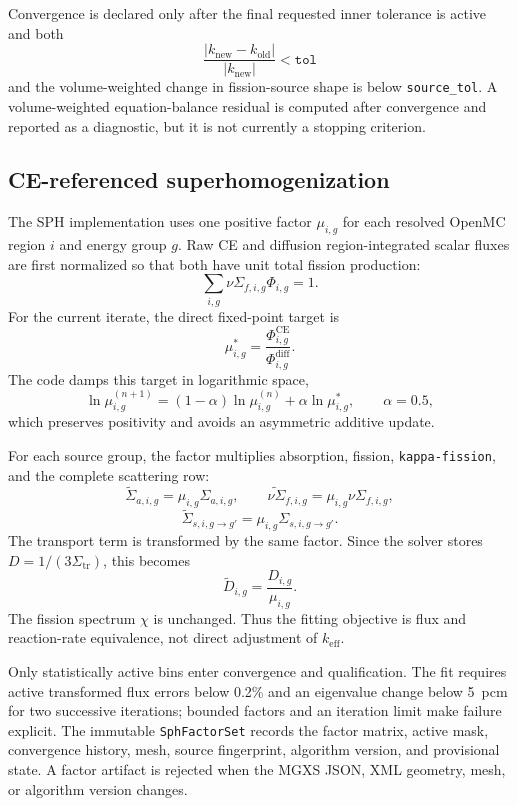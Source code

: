 \documentclass[11pt]{article}
\begin{document}
Convergence is declared only after the final requested inner tolerance is
active and both
\[
\frac{|k_{\mathrm{new}}-k_{\mathrm{old}}|}
{|k_{\mathrm{new}}|}<\texttt{tol}
\]
and the volume-weighted change in fission-source shape is below
\texttt{source\_tol}.  A volume-weighted equation-balance residual is computed
after convergence and reported as a diagnostic, but it is not currently a
stopping criterion.

\subsection{CE-referenced superhomogenization}

The SPH implementation uses one positive factor $\mu_{i,g}$ for each resolved
OpenMC region $i$ and energy group $g$.  Raw CE and diffusion
region-integrated scalar fluxes are first normalized so that both have unit
total fission production:
\[
\sum_{i,g}\nu\Sigma_{f,i,g}\Phi_{i,g}=1.
\]
For the current iterate, the direct fixed-point target is
\[
\mu_{i,g}^{*}
=
\frac{\Phi_{i,g}^{\mathrm{CE}}}
     {\Phi_{i,g}^{\mathrm{diff}}}.
\]
The code damps this target in logarithmic space,
\[
\ln\mu_{i,g}^{(n+1)}
=(1-\alpha)\ln\mu_{i,g}^{(n)}
+ \alpha\ln\mu_{i,g}^{*},
\qquad \alpha=0.5 ,
\]
which preserves positivity and avoids an asymmetric additive update.

For each source group, the factor multiplies absorption, fission,
\texttt{kappa-fission}, and the complete scattering row:
\[
\widetilde{\Sigma}_{a,i,g}=\mu_{i,g}\Sigma_{a,i,g},\qquad
\widetilde{\nu\Sigma}_{f,i,g}=\mu_{i,g}\nu\Sigma_{f,i,g},
\]
\[
\widetilde{\Sigma}_{s,i,g\rightarrow g'}
=\mu_{i,g}\Sigma_{s,i,g\rightarrow g'} .
\]
The transport term is transformed by the same factor.  Since the solver stores
$D=1/(3\Sigma_{\mathrm{tr}})$, this becomes
\[
\widetilde{D}_{i,g}=\frac{D_{i,g}}{\mu_{i,g}} .
\]
The fission spectrum $\chi$ is unchanged.  Thus the fitting objective is flux
and reaction-rate equivalence, not direct adjustment of $k_{\mathrm{eff}}$.

Only statistically active bins enter convergence and qualification.  The fit
requires active transformed flux errors below 0.2\% and an eigenvalue change
below 5~pcm for two successive iterations; bounded factors and an iteration
limit make failure explicit.  The immutable \texttt{SphFactorSet} records the
factor matrix, active mask, convergence history, mesh, source fingerprint,
algorithm version, and provisional state.  A factor artifact is rejected when
the MGXS JSON, XML geometry, mesh, or algorithm version changes.
\end{document}
